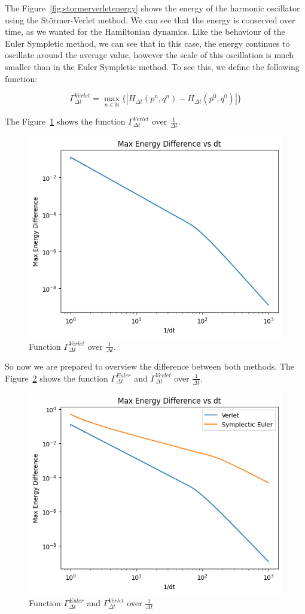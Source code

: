 \documentclass{article}
\begin{document}
The Figure~\ref{fig:stormerverletenergy} shows the energy of the harmonic oscillator using the Störmer-Verlet method. We can see that the energy is conserved over time, as we wanted for the Hamiltonian dynamics. Like the behaviour of the Euler Sympletic method, we can see that in this case, the energy continues to oscillate around the average value, however the scale of this oscillation is much smaller than in the Euler Sympletic method. To see this, we define the following function:

\[
	\Gamma_{\Delta t}^{Verlet} = \max_{n \in \mathbb{N}}\{|H_{\Delta t}(p^n, q^n) - H_{\Delta t}(p^0, q^0)|\}
\]

The Figure~\ref*{fig:stormerverletmaxenergy} shows the function \(\Gamma_{\Delta t}^{Verlet}\) over \(\frac{1}{\Delta t}\).

\begin{figure}[H]
	\centering
	\includegraphics[width=0.5\linewidth]{./Figures/Sympletic/verletmaxenergy.png}
	\caption{Function \(\Gamma_{\Delta t}^{Verlet}\) over \(\frac{1}{\Delta t}.\)}
	\label{fig:stormerverletmaxenergy}
\end{figure}

So now we are prepared to overview the difference between both methods. The Figure~\ref*{fig:comparisonmaxenergy} shows the function \(\Gamma_{\Delta t}^{Euler}\) and \(\Gamma_{\Delta t}^{Verlet}\) over \(\frac{1}{\Delta t}\).

\begin{figure}[H]
	\centering
	\includegraphics[width=0.5\linewidth]{./Figures/Sympletic/maxenergydifference.png}
	\caption{Function \(\Gamma_{\Delta t}^{Euler}\) and \(\Gamma_{\Delta t}^{Verlet}\) over \(\frac{1}{\Delta t}\)}
	\label{fig:comparisonmaxenergy}
\end{figure}
\end{document}
